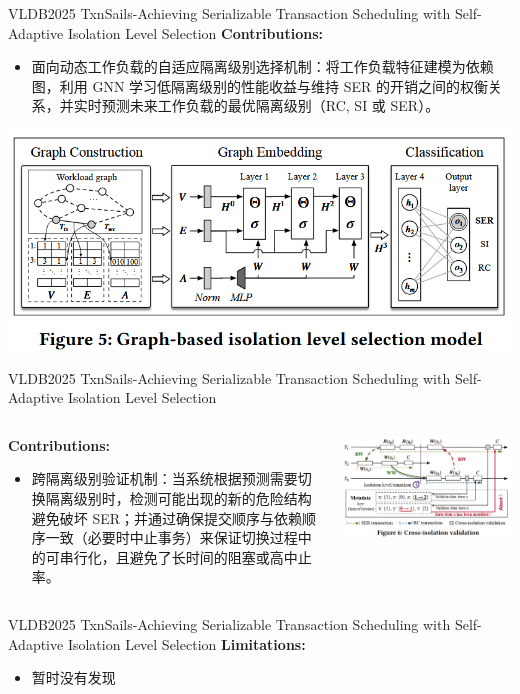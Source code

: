 \begin{frame}{VLDB2025 TxnSails-Achieving Serializable Transaction Scheduling with Self-Adaptive Isolation Level Selection}
	\textbf{Contributions: }
	\begin{itemize}
		\item 面向动态工作负载的自适应隔离级别选择机制：将工作负载特征建模为依赖图，利用 GNN 学习低隔离级别的性能收益与维持 SER 的开销之间的权衡关系，并实时预测未来工作负载的最优隔离级别（RC, SI 或 SER）。
	\end{itemize}
	\begin{center}
		\includegraphics[width=0.8\linewidth]{figs/TxnSails-selection-model}
	\end{center}
\end{frame}

\begin{frame}{VLDB2025 TxnSails-Achieving Serializable Transaction Scheduling with Self-Adaptive Isolation Level Selection}
	\begin{columns}
		\begin{column}{0.5\textwidth}
			\textbf{Contributions: }
			\begin{itemize}
				\item 跨隔离级别验证机制：当系统根据预测需要切换隔离级别时，检测可能出现的新的危险结构避免破坏 SER；并通过确保提交顺序与依赖顺序一致（必要时中止事务）来保证切换过程中的可串行化，且避免了长时间的阻塞或高中止率。
			\end{itemize}
		\end{column}
		\begin{column}{0.5\textwidth}
			\includegraphics[width=0.98\linewidth]{figs/TxnSails-cross-isolation}
		\end{column}
	\end{columns}
\end{frame}

\begin{frame}{VLDB2025 TxnSails-Achieving Serializable Transaction Scheduling with Self-Adaptive Isolation Level Selection}
	\textbf{Limitations: }
	\begin{itemize}
		\item 暂时没有发现
	\end{itemize}
\end{frame}

